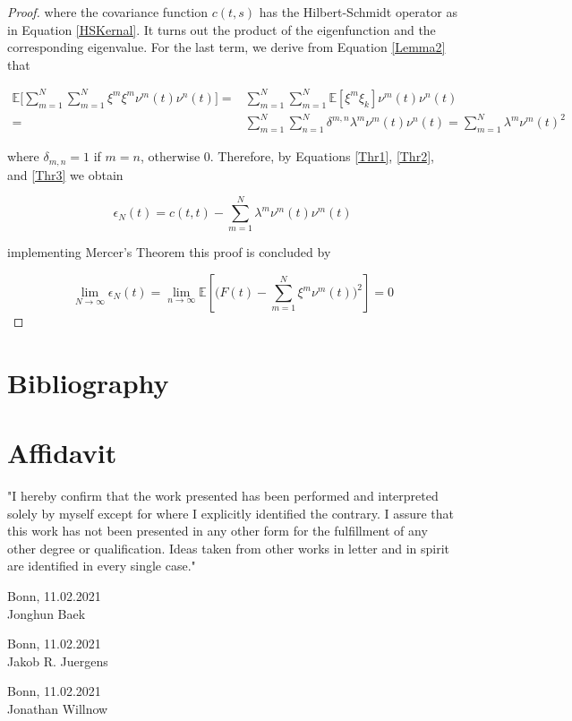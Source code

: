 \documentclass[11pt,twoside,a4paper]{article}
\begin{document}
\begin{proof}
		where the covariance function $c(t,s)$ has the Hilbert-Schmidt operator as in Equation \ref{HSKernal}. It turns out the product of the eigenfunction and the corresponding eigenvalue. For the last term, we derive from Equation \ref{Lemma2} that
		
		\begin{equation}\label{Thr3}
			\begin{split}
				\mathbb{E}\bigg[\sum_{m=1}^{N} \sum_{m=1}^{N} \xi^m \xi^m \nu^m(t) \nu^n(t)\bigg] = & \sum_{m=1}^{N} \sum_{m=1}^{N} \mathbb{E}[\xi^m \xi_{k}] \nu^m(t) \nu^n(t)\\
				= & \sum_{m=1}^{N} \sum_{n=1}^{N} \delta^{m,n} \lambda^m \nu^m(t) \nu^n(t) = 		\sum_{m=1}^{N} \lambda^m \nu^m(t)^{2}
			\end{split}	
		\end{equation}
	
		where $\delta_{m,n} = 1$ if $m=n$, otherwise 0. Therefore, by Equations \ref{Thr1}, \ref{Thr2}, and \ref{Thr3} we obtain
		
		\begin{equation}
			\epsilon_{N}(t) = c(t,t) - \sum_{m=1}^{N} \lambda^m \nu^m(t) \nu^m(t)
		\end{equation}
		
		implementing Mercer's Theorem this proof is concluded by
		
		\begin{equation}
			\lim\limits_{N \rightarrow \infty} \epsilon_{N}(t) = \lim\limits_{n \rightarrow \infty} \mathbb{E} \left[\bigg( F(t) - \sum_{m=1}^{N} \xi^m \nu^m(t)\bigg)^2 \right] = 0
		\end{equation}
	
	\end{proof}

	\newpage
	
	\section{Bibliography}
	\printbibliography[heading=none]	
	
	\section*{Affidavit}
	
	\vspace{2cm}
	"I hereby confirm that the work presented has been performed and
	interpreted solely by myself except for where I explicitly identified the
	contrary. I assure that this work has not been presented in any other
	form for the fulfillment of any other degree or qualification. Ideas
	taken from other works in letter and in spirit are identified in every
	single case."
	
	\vspace{2cm}
	Bonn, 11.02.2021 \hrulefill \\
	\hspace*{0mm}Jonghun Baek
	
	\vspace{2cm}
	Bonn, 11.02.2021 \hrulefill \\
	\hspace*{0mm}Jakob R. Juergens
	
	\vspace{2cm}
	Bonn, 11.02.2021 \hrulefill \\
	\hspace*{0mm}Jonathan Willnow
	
	
\end{document}
